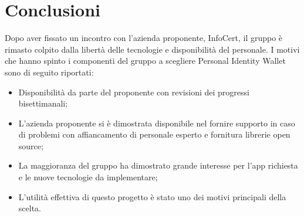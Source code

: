 \section*{Conclusioni}
Dopo aver fissato un incontro con l’azienda proponente, InfoCert, il gruppo è rimasto
colpito dalla libertà delle tecnologie e disponibilità del personale. I motivi che hanno spinto
i componenti del gruppo a scegliere Personal Identity Wallet sono di seguito riportati:

\begin{itemize}
    \item Disponibilità da parte del proponente con revisioni dei progressi bisettimanali;
    \item L’azienda proponente si è dimostrata disponibile nel fornire supporto in caso di problemi con affiancamento di personale esperto e fornitura librerie open source;
    \item La maggioranza del gruppo ha dimostrato grande interesse per l’app richiesta e le nuove tecnologie da implementare;
    \item L’utilità effettiva di questo progetto è stato uno dei motivi principali della scelta.
\end{itemize}